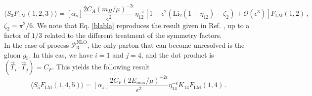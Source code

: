 \documentclass[a4paper, 12pt]{book}
\begin{document}
\begin{equation}
  \langle S_3 F_\mathrm{LM}(1,2,3) \rangle = [\alpha_s]  \frac{2 C_A (m_H/\mu)^{-2 \epsilon}}{\epsilon^2} \eta_{12}^{-\epsilon}[1+\epsilon^2(\mathrm{Li}_2(1-\eta_{12})-\zeta_2)+\mathcal{O}(\epsilon^3)]F_\mathrm{LM}(1,2) \, ,
  \label{blabla}
\end{equation}
$\zeta_2 = \pi^2/6$. We note that Eq. \ref{blabla} reproduces the result given in Ref. \cite{Caola:1907}, up to a factor of $1/3$ related to the different treatment of the symmetry factors. \\

In the case of process $\mathcal{P}_{3}^{\mathrm{NLO}}$, the only parton that can become unresolved is the gluon $g_5$. In this cas, we have $i=1$ and $j=4$, and the dot product is $(\vec{T}_i \cdot \vec{T}_j)=C_F$. This yields the following result
\begin{equation}
  \langle S_5 F_\mathrm{LM}(1,4,5) \rangle =  [\alpha_s]  \frac{2 C_F (2E_{\mathrm{max}}/\mu)^{-2\epsilon} }{\epsilon^2} \eta_{14}^{-\epsilon} K_{14} F_\mathrm{LM}(1,4) \, .
\end{equation}

\end{document}
